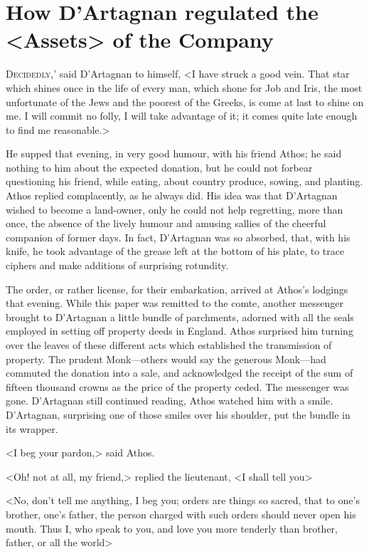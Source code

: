\chapter{How D'Artagnan regulated the <Assets> of the Company}

\lettrine[ante=`]{D}{ecidedly},' said D'Artagnan to himself, <I have struck a good vein. That star which shines once in the life of every man, which shone for Job and Iris, the most unfortunate of the Jews and the poorest of the Greeks, is come at last to shine on me. I will commit no folly, I will take advantage of it; it comes quite late enough to find me reasonable.>

He supped that evening, in very good humour, with his friend Athos; he said nothing to him about the expected donation, but he could not forbear questioning his friend, while eating, about country produce, sowing, and planting. Athos replied complacently, as he always did. His idea was that D'Artagnan wished to become a land-owner, only he could not help regretting, more than once, the absence of the lively humour and amusing sallies of the cheerful companion of former days. In fact, D'Artagnan was so absorbed, that, with his knife, he took advantage of the grease left at the bottom of his plate, to trace ciphers and make additions of surprising rotundity.

The order, or rather license, for their embarkation, arrived at Athos's lodgings that evening. While this paper was remitted to the comte, another messenger brought to D'Artagnan a little bundle of parchments, adorned with all the seals employed in setting off property deeds in England. Athos surprised him turning over the leaves of these different acts which established the transmission of property. The prudent Monk—others would say the generous Monk—had commuted the donation into a sale, and acknowledged the receipt of the sum of fifteen thousand crowns as the price of the property ceded. The messenger was gone. D'Artagnan still continued reading, Athos watched him with a smile. D'Artagnan, surprising one of those smiles over his shoulder, put the bundle in its wrapper.

<I beg your pardon,> said Athos.

<Oh! not at all, my friend,> replied the lieutenant, <I shall tell you\longdash>

<No, don't tell me anything, I beg you; orders are things so sacred, that to one's brother, one's father, the person charged with such orders should never open his mouth. Thus I, who speak to you, and love you more tenderly than brother, father, or all the world\longdash>

